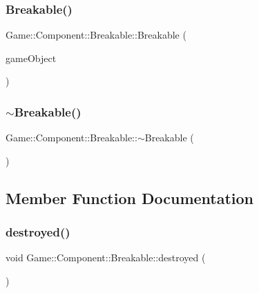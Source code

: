 \subsubsection{\texorpdfstring{Breakable()}{Breakable()}}
{\footnotesize\ttfamily Game\+::\+Component\+::\+Breakable\+::\+Breakable (\begin{DoxyParamCaption}\item[{\mbox{\hyperlink{class_beer_engine_1_1_game_object}{Beer\+Engine\+::\+Game\+Object}} $\ast$}]{game\+Object }\end{DoxyParamCaption})}

\mbox{\label{class_game_1_1_component_1_1_breakable_a865e322dd9c71227b699f85bd492b481}} 
\subsubsection{\texorpdfstring{$\sim$\+Breakable()}{~Breakable()}}
{\footnotesize\ttfamily Game\+::\+Component\+::\+Breakable\+::$\sim$\+Breakable (\begin{DoxyParamCaption}\item[{void}]{ }\end{DoxyParamCaption})}



\subsection{Member Function Documentation}
\mbox{\label{class_game_1_1_component_1_1_breakable_a2b58c2c6c0132f8defc9b1e80220530b}} 
\subsubsection{\texorpdfstring{destroyed()}{destroyed()}}
{\footnotesize\ttfamily void Game\+::\+Component\+::\+Breakable\+::destroyed (\begin{DoxyParamCaption}{ }\end{DoxyParamCaption})}



